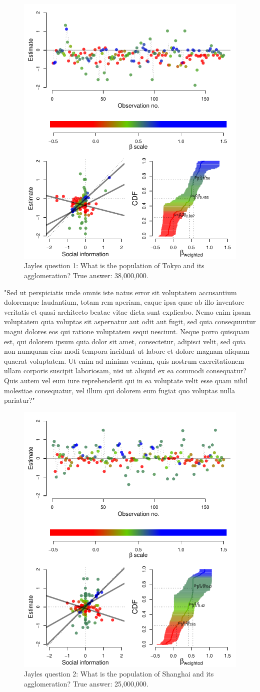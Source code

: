 \documentclass[10pt,a4paper,twocolumn,lineno]{article}
\begin{document}
\begin{figure}[htbp]
	\centering\includegraphics[width=.5\textwidth]{../plots/jayles1.pdf}
	\caption{Jayles question 1: What is the population of Tokyo and its agglomeration? True answer: 38,000,000.}\label{fig: Jayles question 1}
\end{figure}

"Sed ut perspiciatis unde omnis iste natus error sit voluptatem accusantium doloremque laudantium, totam rem aperiam, eaque ipsa quae ab illo inventore veritatis et quasi architecto beatae vitae dicta sunt explicabo. Nemo enim ipsam voluptatem quia voluptas sit aspernatur aut odit aut fugit, sed quia consequuntur magni dolores eos qui ratione voluptatem sequi nesciunt. Neque porro quisquam est, qui dolorem ipsum quia dolor sit amet, consectetur, adipisci velit, sed quia non numquam eius modi tempora incidunt ut labore et dolore magnam aliquam quaerat voluptatem. Ut enim ad minima veniam, quis nostrum exercitationem ullam corporis suscipit laboriosam, nisi ut aliquid ex ea commodi consequatur? Quis autem vel eum iure reprehenderit qui in ea voluptate velit esse quam nihil molestiae consequatur, vel illum qui dolorem eum fugiat quo voluptas nulla pariatur?"

\begin{figure}[htbp]
	\centering\includegraphics[width=.5\textwidth]{../plots/jayles2.pdf}
	\caption{Jayles question 2: What is the population of Shanghai and its agglomeration? True answer: 25,000,000.}\label{fig: Jayles question 2}
\end{figure}
\end{document}
